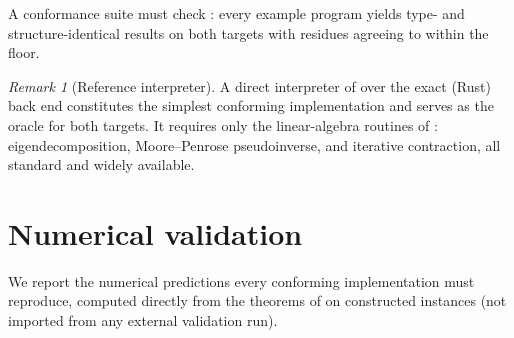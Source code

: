 \documentclass[11pt,a4paper]{article}
\theoremstyle{thmstyle}
\theoremstyle{definition}
\theoremstyle{remark}
\newtheorem{remark}[theorem]{Remark}
\begin{document}
A conformance suite must check : every example
program yields type- and structure-identical results on both targets
with residues agreeing to within the floor.

\begin{remark}[Reference interpreter]
\label{rem:reference}
A direct interpreter of  over the exact (Rust) back end
constitutes the simplest conforming implementation and serves as the
oracle for both targets. It requires only the linear-algebra routines
of : eigendecomposition, Moore--Penrose pseudoinverse,
and iterative contraction, all standard and widely available.
\end{remark}

\section{Numerical validation}
\label{sec:validation}

We report the numerical predictions every conforming implementation
must reproduce, computed directly from the theorems of
 on constructed instances (not imported from any
external validation run).
\end{document}
